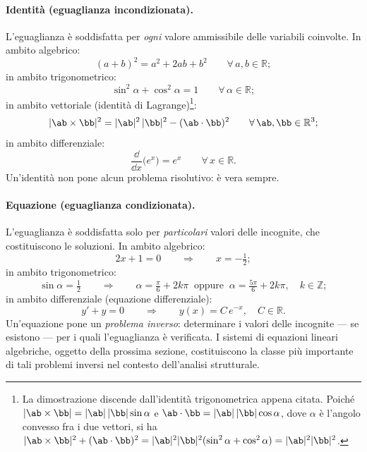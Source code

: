 \paragraph{Identit\`a (eguaglianza incondizionata).}
L'eguaglianza \`e soddisfatta per \textit{ogni} valore ammissibile delle variabili coinvolte. In ambito algebrico:
\begin{equation}
	(a+b)^2 = a^2 + 2ab + b^2 \qquad \forall\, a,b \in \mathbb{R};
\end{equation}
in ambito trigonometrico:
\begin{equation}
	\sin^2\alpha + \cos^2\alpha = 1 \qquad \forall\, \alpha \in \mathbb{R};
\end{equation}
in ambito vettoriale (identit\`a di Lagrange)\footnote{La
	dimostrazione discende dall'identit\`a trigonometrica appena
	citata. Poich\'e $|\ab\times\bb| = |\ab|\,|\bb|\sin\alpha$
	e $\ab\cdot\bb = |\ab|\,|\bb|\cos\alpha$, dove $\alpha$
	\`e l'angolo convesso fra i due vettori, si ha
	$|\ab\times\bb|^2 + (\ab\cdot\bb)^2
	= |\ab|^2|\bb|^2(\sin^2\alpha + \cos^2\alpha)
	= |\ab|^2|\bb|^2$.}:
\begin{equation}
	|\ab\times\bb|^2
	= |\ab|^2\,|\bb|^2 - (\ab\cdot\bb)^2
	\qquad \forall\, \ab,\bb \in \mathbb{R}^3;
\end{equation}
in ambito differenziale:
\begin{equation}
	\frac{\dd}{\dd x}\bigl(e^x\bigr) = e^x \qquad \forall\, x \in \mathbb{R}.
\end{equation}
Un'identit\`a non pone alcun problema risolutivo: \`e vera sempre.

\paragraph{Equazione (eguaglianza condizionata).}
L'eguaglianza \`e soddisfatta solo per \textit{particolari} valori delle
incognite, che costituiscono le soluzioni. In ambito algebrico:
\begin{equation}
	2x + 1 = 0 \qquad \Longrightarrow \qquad x = -\tfrac{1}{2};
\end{equation}
in ambito trigonometrico:
\begin{equation}
	\sin\alpha = \tfrac{1}{2} \qquad \Longrightarrow \qquad
	\alpha = \tfrac{\pi}{6} + 2k\pi \;\;\text{oppure}\;\;
	\alpha = \tfrac{5\pi}{6} + 2k\pi, \quad k \in \mathbb{Z};
\end{equation}
in ambito differenziale (equazione differenziale):
\begin{equation}
	y' + y = 0 \qquad \Longrightarrow \qquad y(x) = C\, e^{-x},
	\quad C \in \mathbb{R}.
\end{equation}
Un'equazione pone un \textit{problema inverso}: determinare i valori delle
incognite --- se esistono --- per i quali l'eguaglianza \`e verificata. I
sistemi di equazioni lineari algebriche, oggetto della prossima sezione,
costituiscono la classe pi\`u importante di tali problemi inversi nel
contesto dell'analisi strutturale.

